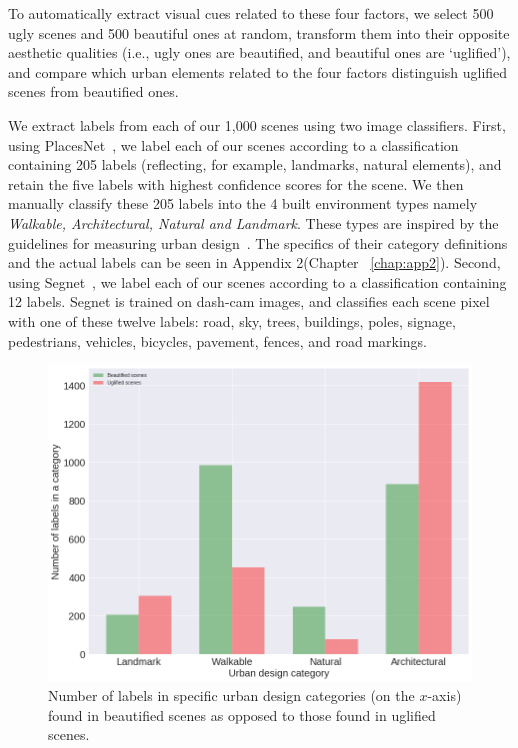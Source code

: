 To automatically extract visual cues related to these four factors, we select 500 ugly scenes and 500 beautiful ones at random, transform them into their opposite aesthetic qualities (i.e., ugly ones are beautified, and beautiful ones are `uglified'), and compare which urban elements related to the four factors distinguish uglified scenes from beautified ones. 

We extract labels from each of our 1,000 scenes using two image classifiers. First, using PlacesNet~\cite{zhou2014learning}, we label each of our scenes according to a classification containing 205 labels (reflecting, for example, landmarks, natural elements), and retain the five labels with highest confidence scores for the scene. We then manually classify these 205 labels into the 4 built environment types namely \textit{Walkable, Architectural, Natural and Landmark}. These types are inspired by the guidelines for measuring urban design~\cite{ewing2013measuring}. The specifics of their category definitions and the actual labels can be seen in Appendix 2(Chapter ~\ref{chap:app2}).  Second, using Segnet~\cite{badrinarayanan2015segnet}, we  label each of our scenes according to a classification containing 12 labels. Segnet is trained on dash-cam images, and classifies each scene pixel with one of these twelve labels: road, sky, trees,  buildings, poles, signage, pedestrians, vehicles, bicycles, pavement, fences, and road markings. 

\begin{figure}[h]
    \centering
    \includegraphics[width=\columnwidth]{taxonomyCount.png}
    \caption{Number of labels in specific urban design categories (on the $x$-axis) found in beautified scenes as opposed to those found in uglified scenes.}
    \label{fig:taxonomyCount}
\end{figure}


